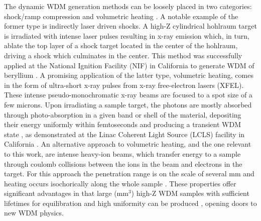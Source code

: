 The dynamic WDM generation methods can be loosely placed in two categories: shock/ramp compression and volumetric heating \citep{riley2017generation}. A notable example of the former type is indirectly laser driven shocks. A high-Z cylindrical hohlraum target is irradiated with intense laser pulses resulting in x-ray emission which, in turn, ablate the top layer of a shock target located in the center of the hohlraum, driving a shock which culminates in the center. This method was successfully applied at the National Ignition Facility (NIF) in California to generate WDM of beryllium \citep{doppner2023observing}. A promising application of the latter type, volumetric heating, comes in the form of ultra-short x-ray pulses from x-ray free-electron lasers (XFEL). These intense pseudo-monochromatic x-ray beams are focused to a spot size of a few microns. Upon irradiating a sample target, the photons are mostly absorbed through photo-absorption in a given band or shell of the material, depositing their energy uniformly within femtoseconds and producing a transient WDM state \citep{riley2017generation}, as demonstrated at the Linac Coherent Light Source (LCLS) facility in California \citep{vinko2012creation}. An alternative approach to volumetric heating, and the one relevant to this work, are intense heavy-ion beams, which transfer energy to a sample through coulomb collisions between the ions in the beam and electrons in the target. For this approach the penetration range is on the 
scale of several mm and heating occurs 
isochorically along the whole sample 
\citep{tahir2008studies}. These properties offer significant advantages in that large (mm$^3$) high-Z WDM samples with sufficient lifetimes for equilibration
and high uniformity can be produced \citep{riley2021warm, tahir2022planetary}, opening doors to new 
WDM physics. 


